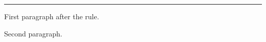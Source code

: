 \vsize=120pt
\hsize=4in
\hrule
\noindent First paragraph after the rule.
\par
\noindent Second paragraph.
\par
\eject
\bye
